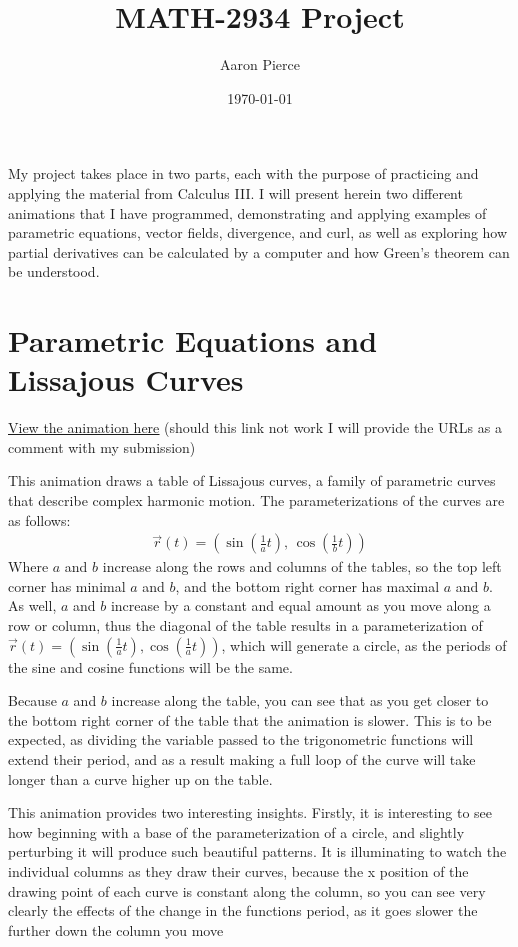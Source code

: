 \documentclass{article}
\title{MATH-2934 Project}
\author{Aaron Pierce}
\date{\today}
\begin{document}
    \maketitle

    My project takes place in two parts, each with the purpose of practicing and applying the material from Calculus III.
    I will present herein two different animations that I have programmed, demonstrating and applying examples of parametric equations, vector fields, divergence, and curl,
    as well as exploring how partial derivatives can be calculated by a computer and how Green's theorem can be understood.

    \section{Parametric Equations and Lissajous Curves}
    \underline{\href{https://saxten2011.github.io/AlmostLissajousCurves/}{View the animation here}} (should this link not work I will provide the URLs as a comment with my submission)

    This animation draws a table of Lissajous curves, a family of parametric curves that describe complex harmonic motion.
    The parameterizations of the curves are as follows:
    \begin{gather*}
        \vec{r}(t) = \left( \sin(\frac{1}{a} t),\, \cos(\frac{1}{b} t) \right)
    \end{gather*}
    Where $a$ and $b$ increase along the rows and columns of the tables, so the top left corner has minimal $a$ and $b$, and the bottom right corner has maximal $a$ and $b$.
    As well, $a$ and $b$ increase by a constant and equal amount as you move along a row or column, thus the diagonal of the table results in a parameterization of 
    $\vec{r}(t) = \left( \sin(\frac{1}{a} t), \cos(\frac{1}{a} t) \right)$, which will generate a circle, as the periods of the sine and cosine functions will be the same.

    Because $a$ and $b$ increase along the table, you can see that as you get closer to the bottom right corner of the table that the animation is slower.
    This is to be expected, as dividing the variable passed to the trigonometric functions will extend their period, and as a result making a full loop of the curve will take longer than a curve higher up on the table.

    This animation provides two interesting insights.
    Firstly, it is interesting to see how beginning with a base of the parameterization of a circle, and slightly perturbing it will produce such beautiful patterns.
    It is illuminating to watch the individual columns as they draw their curves, because the x position of the drawing point of each curve is constant along the column, so you can see very clearly the effects of the change in the functions period, as it goes slower the further down the column you move
\end{document}

